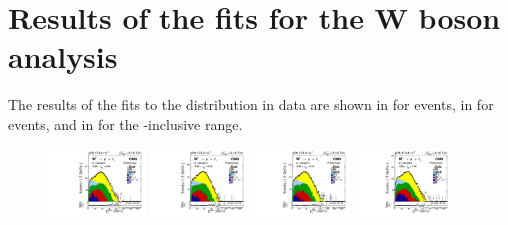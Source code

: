 \chapter{Results of the fits for the W boson analysis}\label{app:WBoson_SignalExtraction_Fits}

The results of the fits to the \ptmiss distribution in data are shown in  for \WToMuNuMi events, in  for \WToMuNuPl events, and in  for the \etaMuCM-inclusive range.

\begin{figure}[htb!]
\centering
\begin{tiny}
\includegraphics[width=0.23\textwidth]{Figures/WBoson/Analysis/SignalExtraction/Signal/LOG/PLOT_MET_DATA_WToMuMi_PA_Model_TEMP_WDYDYToTauWToTauTTbar_ModifiedRayleigh_QCD_MuEtaCM_-286_-260_MuIso_0_15.pdf}
\includegraphics[width=0.23\textwidth]{Figures/WBoson/Analysis/SignalExtraction/Signal/LOG/PLOT_MET_DATA_WToMuMi_PA_Model_TEMP_WDYDYToTauWToTauTTbar_ModifiedRayleigh_QCD_MuEtaCM_-260_-240_MuIso_0_15.pdf}
\includegraphics[width=0.23\textwidth]{Figures/WBoson/Analysis/SignalExtraction/Signal/LOG/PLOT_MET_DATA_WToMuMi_PA_Model_TEMP_WDYDYToTauWToTauTTbar_ModifiedRayleigh_QCD_MuEtaCM_-240_-220_MuIso_0_15.pdf}
\includegraphics[width=0.23\textwidth]{Figures/WBoson/Analysis/SignalExtraction/Signal/LOG/PLOT_MET_DATA_WToMuMi_PA_Model_TEMP_WDYDYToTauWToTauTTbar_ModifiedRayleigh_QCD_MuEtaCM_-220_-193_MuIso_0_15.pdf}

\end{tiny}
\end{figure}
